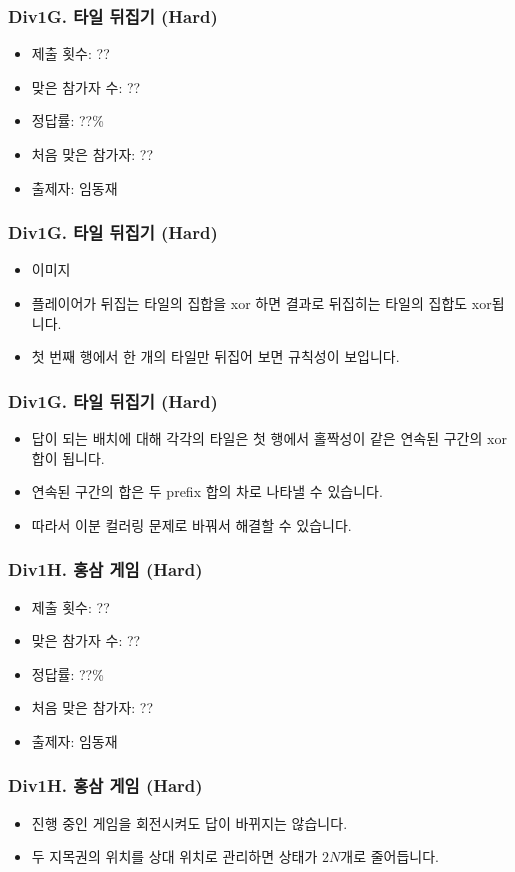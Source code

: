 \documentclass[xetex]{beamer}
\begin{document}
\begin{frame}
  \frametitle{Div1G. 타일 뒤집기 (Hard)}
  \begin{itemize}
    \item 제출 횟수: ??
    \item 맞은 참가자 수: ??
    \item 정답률: ??\%
    \item 처음 맞은 참가자: ??
    \item 출제자: 임동재
  \end{itemize}
\end{frame}

\begin{frame}
  \frametitle{Div1G. 타일 뒤집기 (Hard)}
  \begin{itemize}
    \item 이미지
    \item 플레이어가 뒤집는 타일의 집합을 xor 하면 결과로 뒤집히는 타일의 집합도 xor됩니다.
    \item 첫 번째 행에서 한 개의 타일만 뒤집어 보면 규칙성이 보입니다.
  \end{itemize}
\end{frame}

\begin{frame}
  \frametitle{Div1G. 타일 뒤집기 (Hard)}
  \begin{itemize}
    \item 답이 되는 배치에 대해 각각의 타일은 첫 행에서 홀짝성이 같은 연속된 구간의 xor 합이 됩니다.
    \item 연속된 구간의 합은 두 prefix 합의 차로 나타낼 수 있습니다.
    \item 따라서 이분 컬러링 문제로 바꿔서 해결할 수 있습니다.
  \end{itemize}
\end{frame}

\begin{frame}
  \frametitle{Div1H. 홍삼 게임 (Hard)}
  \begin{itemize}
    \item 제출 횟수: ??
    \item 맞은 참가자 수: ??
    \item 정답률: ??\%
    \item 처음 맞은 참가자: ??
    \item 출제자: 임동재
  \end{itemize}
\end{frame}

\begin{frame}
  \frametitle{Div1H. 홍삼 게임 (Hard)}
  \begin{itemize}
    \item 진행 중인 게임을 회전시켜도 답이 바뀌지는 않습니다.
    \item 두 지목권의 위치를 상대 위치로 관리하면 상태가 $2N$개로 줄어듭니다.
  \end{itemize}
\end{frame}
\end{document}
